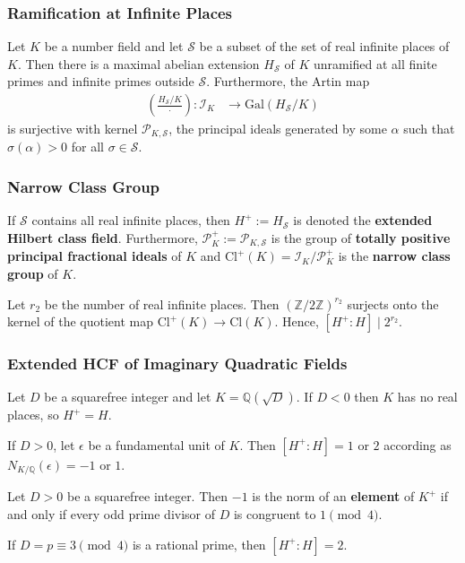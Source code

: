 \documentclass{beamer}
\newcommand{\Gal}{\mathrm{Gal}}
\newcommand{\Cl}{\mathrm{Cl}}
\newcommand{\QQ}{\mathbb{Q}}
\newcommand{\ZZ}{\mathbb{Z}}
\theoremstyle{plain}
\begin{document}
\begin{frame}
    \frametitle{Ramification at Infinite Places}
    \begin{theorem}
        Let $K$ be a number field and let $\mathcal{S}$ be a subset of the set of real infinite places of $K$. \pause Then there is a maximal abelian extension $H_\mathcal{S}$ of $K$ unramified at all finite primes and infinite primes outside $\mathcal{S}$. \pause Furthermore, the Artin map
        \begin{align*}
            \left(\frac{H_\mathcal{S}/K}{\cdot}\right):\mathcal{I}_{K}&\longrightarrow\Gal(H_\mathcal{S}/K)
        \end{align*}
        is surjective with kernel $\mathcal{P}_{K,\mathcal{S}}$, the principal ideals generated by some $\alpha$ such that $\sigma(\alpha)>0$ for all $\sigma\in\mathcal{S}$.
    \end{theorem}
\end{frame}

\begin{frame}
    \frametitle{Narrow Class Group}
    \begin{definition}
        If $\mathcal{S}$ contains all real infinite places, then $H^+:=H_\mathcal{S}$ is denoted the \textbf{extended Hilbert class field}. \pause Furthermore, $\mathcal{P}_K^+:=\mathcal{P}_{K,\mathcal{S}}$ is the group of \textbf{totally positive principal fractional ideals} of $K$ \pause and $\Cl^+(K)=\mathcal{I}_K/\mathcal{P}^+_K$ is the \textbf{narrow class group} of $K$.
    \end{definition}\pause

    \begin{lemma}
        Let $r_2$ be the number of real infinite places. Then $(\ZZ/2\ZZ)^{r_2}$ surjects onto the kernel of the quotient map $\Cl^+(K)\to\Cl(K)$. \pause Hence, $[H^+:H]\mid 2^{r_2}$.        
    \end{lemma}        
\end{frame}

\begin{frame}
    \frametitle{Extended HCF of Imaginary Quadratic Fields}
    Let $D$ be a squarefree integer and let $K=\QQ(\sqrt{D})$. If $D<0$ then $K$ has no real places, so $H^+=H$.\pause
    \begin{theorem}
        If $D>0$, let $\epsilon$ be a fundamental unit of $K$. Then $[H^+:H]=1$ or $2$ according as $N_{K/\QQ}(\epsilon)=-1$ or $1$.
    \end{theorem}
    \pause
    \begin{lemma}
        Let $D>0$ be a squarefree integer. Then $-1$ is the norm of an \textbf{element} of $K^+$ if and only if every odd prime divisor of $D$ is congruent to $1\pmod{4}$.
    \end{lemma}
    \pause
    \begin{corollary}
        If $D=p\equiv3\pmod{4}$ is a rational prime, then $[H^+:H]=2$. 
    \end{corollary}
\end{frame}
\end{document}
